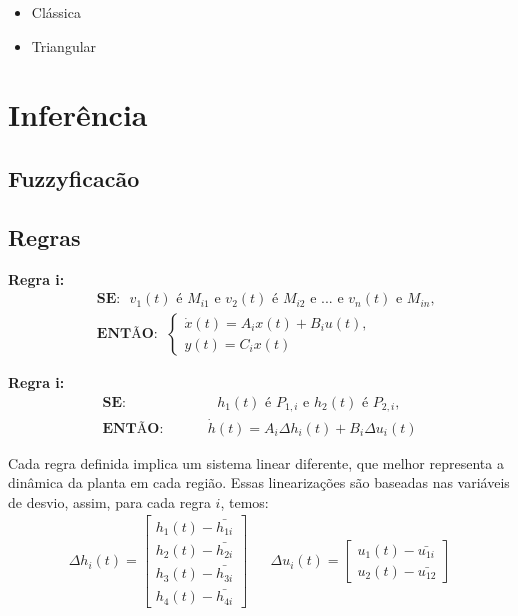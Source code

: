 	\begin{itemize}
		\item Clássica \\
		\item Triangular		
	\end{itemize}
	
	
\section{Inferência}

\subsection{Fuzzyficacão}

\subsection{Regras}
	
	\textbf{Regra i:}
	\begin{align}
		&\textbf{SE:} \text{ $v_1(t)$ é $M_{i1}$ e $v_2(t)$ é $M_{i2}$ e ... e $v_n(t)$ e $M_{in}$,} \\
		&\textbf{ENTÃO}: \ \ \begin{cases}
			\dot{x}(t) = A_ix(t) + B_iu(t),\\
			y(t) = C_ix(t)
		\end{cases}
	\label{eqRegraIGeral}
	\end{align}
	
	\textbf{Regra i:}
	\begin{align}
		\textbf{SE:}  \hspace{1cm} &\text{ $h_1(t)$ é $P_{1,i}$ e $h_2(t)$ é $P_{2,i}$,} \\
		\textbf{ENTÃO:} \hspace{1cm} & \dot{h}(t) =  A_i \Delta h_i(t) +  B_i \Delta u_i(t)
	\end{align}
	
	Cada regra definida implica um sistema linear diferente, que melhor representa a dinâmica da planta em cada região. Essas linearizações são baseadas nas variáveis de desvio, assim, para cada regra $i$, temos:
	\begin{align}
		\Delta h_i(t) =
		\begin{bmatrix}
			h_1(t) - \bar{h_{1i}} \\
			h_2(t) - \bar{h_{2i}} \\
			h_3(t) - \bar{h_{3i}} \\
			h_4(t) - \bar{h_{4i}}
		\end{bmatrix} 
		&&
		\Delta u_i(t) = 
		\begin{bmatrix}
			u_1(t) - \bar{u_{1i}} \\
			u_2(t) - \bar{u_{12}}
		\end{bmatrix}
	\end{align}	

